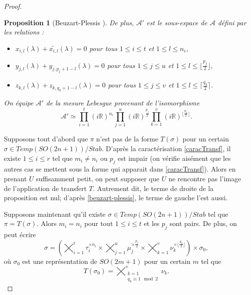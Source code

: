 \documentclass{amsart}
\newtheorem{proposition}{Proposition}[section]
\begin{document}
\begin{proof}
\begin{proposition}[Beuzart-Plessis \cite{beuzart-plessis}]
De plus, $\mathcal{A}'$ est le sous-espace de $\mathcal{A}$ défini par les relations :
\begin{itemize}
\item $x_{i,l}(\lambda) + \widetilde{x_{i,l}}(\lambda) = 0$ pour tous $1 \leq i \leq t$ et $1 \leq l \leq n_i$,
\item $y_{j,l}(\lambda) + y_{j,p_j+1-l}(\lambda) = 0$ pour tous $1 \leq j \leq u$ et $1 \leq l \leq \lfloor \frac{p_j}{2} \rfloor$,
\item $z_{k,l}(\lambda) + z_{k,q_k+1-l}(\lambda) = 0$ pour tous $1 \leq j \leq v$ et $1 \leq l \leq \lceil \frac{q_k}{2} \rceil$.
\end{itemize}
On équipe $\mathcal{A}'$ de la mesure Lebesgue provenant de l'isomorphisme
\begin{equation}
\mathcal{A}' \simeq \prod_{i=1}^t (i\mathbb{R})^{n_i} \prod_{j=1}^u (i\mathbb{R})^{\frac{p_j}{2}} \prod_{k=1}^v (i\mathbb{R})^{\lfloor \frac{q_k}{2} \rfloor}.
\end{equation}
\end{proposition}

Supposons tout d'abord que $\pi$ n'est pas de la forme $T(\sigma)$ pour un certain $\sigma \in Temp(SO(2n+1))/Stab$. D'après la caractérisation \ref{caracTransf}, il existe $1 \leq i \leq r$ tel que $m_i \neq n_i$ ou $p_j$ est impair (on vérifie aisément que les autres cas se mettent sous la forme qui apparait dans \ref{caracTransf}). Alors en prenant $U$ suffisamment petit, on peut supposer que $U$ ne rencontre pas l'image de l'application de transfert $T$. Autrement dit, le terme de droite de la proposition est nul; d'après \ref{beuzart-plessis}, le terme de gauche l'est aussi.

Supposons maintenant qu'il existe $\sigma \in Temp(SO(2n+1))/Stab$ tel que $\pi = T(\sigma)$. Alors $m_i = n_i$ pour tout $1 \leq i \leq t$ et les $p_j$ sont pairs. De plus, on peut écrire
\begin{equation}
\sigma = \left( \bigtimes_{i=1}^t \tau_i^{\times n_i} \times \bigtimes_{j=1}^u \mu_j^{\times \frac{p_j}{2}} \times \bigtimes_{k=1}^v \nu_k^{\times \lfloor \frac{q_k}{2}\rfloor} \right) \times \sigma_0,
\end{equation}
où $\sigma_0$ est une représentation de $SO(2m+1)$ pour un certain $m$ tel que
\begin{equation}
\label{sigma0}
T(\sigma_0) = \bigtimes_{\substack{k=1 \\ q_k \equiv 1 \mod 2}}^v \nu_k.
\end{equation}


\end{proof}
\end{document}
